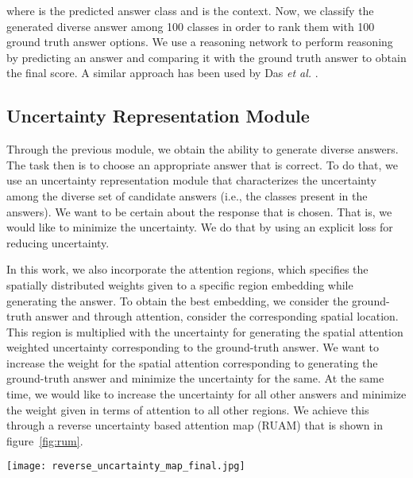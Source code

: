 \documentclass[review]{elsarticle}
\begin{document}
where  is the predicted answer class and  is the context. Now, we classify the generated diverse answer among  100 classes in order to rank them with 100 ground truth answer options. We use a reasoning network to perform reasoning by predicting an answer and comparing it with the ground truth answer to obtain the final score. A similar approach has been used by Das {\it et al.} \cite{Das_ICCV2017}.
















\subsection{Uncertainty Representation Module}
\label{Uncertainty}
Through the previous module, we obtain the ability to generate diverse answers. The task then is to choose an appropriate answer that is correct. To do that, we use an uncertainty representation module that characterizes the uncertainty among the diverse set of candidate answers (i.e., the classes present in the answers). We want to be certain about the response that is chosen. That is, we would like to minimize the uncertainty. We do that by using an explicit loss for reducing uncertainty. 

In this work, we also incorporate the attention regions, which specifies the spatially distributed weights given to a specific region embedding while generating the answer. To obtain the best embedding, we consider the ground-truth answer and through attention, consider the corresponding spatial location. This region is multiplied with the uncertainty for generating the spatial attention weighted uncertainty corresponding to the ground-truth answer. We want to increase the weight for the spatial attention corresponding to generating the ground-truth answer and minimize the uncertainty for the same. At the same time, we would like to increase the uncertainty for all other answers and minimize the weight given in terms of attention to all other regions. We achieve this through a reverse uncertainty based attention map (RUAM) that is shown in figure~\ref{fig:rum}. 



\begin{figure*}[ht]
	\centering
	\texttt{[image: reverse\_uncartainty\_map\_final.jpg]}
	\vspace{-3em}
	\caption{Reverse Uncertainty based Attention Map (RUAM): We obtain attention embedding  from the attention network  using image, question and history embeddings . Then we classify into answer class and obtain the uncertainty present in the data. Then we obtain reverse uncertainty map with will combine with attention map to get better confidence on the attention map as shown in the figure.}
\label{fig:rum}
\end{figure*}
\end{document}
